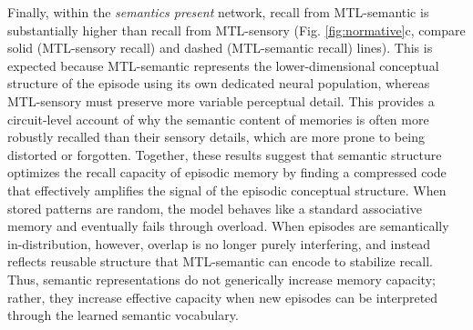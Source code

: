 \documentclass{article}
\begin{document}
\newline\newline
Finally, within the \textit{semantics present} network, recall from MTL-semantic is substantially higher than recall from MTL-sensory (Fig. \ref{fig:normative}c, compare solid (MTL-sensory recall) and dashed (MTL-semantic recall) lines). This is expected because MTL-semantic represents the lower-dimensional conceptual structure of the episode using its own dedicated neural population, whereas MTL-sensory must preserve more variable perceptual detail. This provides a circuit-level account of why the semantic content of memories is often more robustly recalled than their sensory details, which are more prone to being distorted or forgotten.
\newline\newline
Together, these results suggest that semantic structure optimizes the recall capacity of episodic memory by finding a compressed code that effectively amplifies the signal of the episodic conceptual structure. When stored patterns are random, the model behaves like a standard associative memory and eventually fails through overload. When episodes are semantically in-distribution, however, overlap is no longer purely interfering, and instead reflects reusable structure that MTL-semantic can encode to stabilize recall. Thus, semantic representations do not generically increase memory capacity; rather, they increase effective capacity when new episodes can be interpreted through the learned semantic vocabulary.
\end{document}
